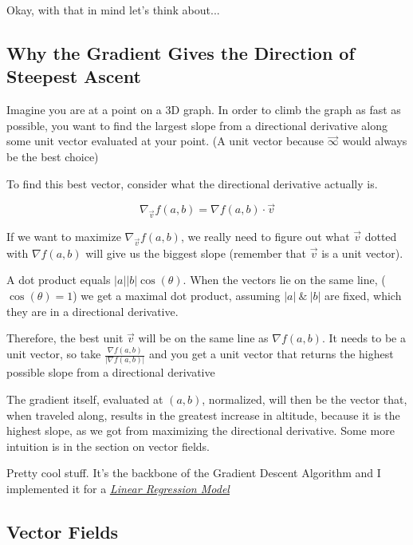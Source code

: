 \documentclass[12pt, letterpaper]{article}
\newcommand{\externalLink}[2]{\emph{\underline{\href{#1}{#2}}}}
\begin{document}
Okay, with that in mind let's think about...

\subsection{Why the Gradient Gives the Direction of Steepest Ascent}

Imagine you are at a point on a 3D graph. In order to climb the graph as fast as possible, you want to find the largest slope from a directional derivative along some unit vector evaluated at your point. (A unit vector because $\vec{\infty}$ would always be the best choice)

To find this best vector, consider what the directional derivative actually is.

\begin{displaymath}
    \nabla_{\vec{v}} f(a, b) = \nabla f(a, b) \cdot \vec{v}
\end{displaymath}

If we want to maximize $\nabla_{\vec{v}} f(a, b)$, we really need to figure out what $\vec{v}$ dotted with $\nabla f(a, b)$ will give us the biggest slope (remember that $\vec{v}$ is a unit vector).

A dot product equals $|a| |b| \cos(\theta)$. When the vectors lie on the same line, ($\cos(\theta) = 1$) we get a maximal dot product, assuming $|a|\ \&\ |b|$ are fixed, which they are in a directional derivative.

Therefore, the best unit $\vec{v}$ will be on the same line as $\nabla f(a, b)$. It needs to be a unit vector, so take $\frac{\nabla f(a, b)}{|\nabla f(a, b)|}$ and you get a unit vector that returns the highest possible slope from a directional derivative

The gradient itself, evaluated at $(a, b)$, normalized, will then be the vector that, when traveled along, results in the greatest increase in altitude, because it is the highest slope, as we got from maximizing the directional derivative. Some more intuition is in the section on vector fields.

Pretty cool stuff. It's the backbone of the Gradient Descent Algorithm and I implemented it for a \externalLink{https://github.com/SAXTEN2011/LinearRegression/blob/master/index.js}{Linear Regression Model}

\subsection{Vector Fields}
\label{ssec:vectorFields}
\end{document}

